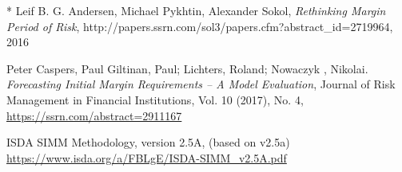 \documentclass[12pt, a4paper]{article}
\begin{document}
\begin{thebibliography}{*}
 Leif B. G. Andersen, Michael Pykhtin, Alexander Sokol, {\em Rethinking Margin Period of Risk},
  http://papers.ssrn.com/sol3/papers.cfm?abstract\_id=2719964, 2016

 Peter Caspers, Paul Giltinan, Paul; Lichters, Roland; Nowaczyk , Nikolai. {\em Forecasting Initial Margin Requirements – A Model Evaluation}, Journal of Risk Management in Financial Institutions, Vol. 10 (2017), No. 4, \url{https://ssrn.com/abstract=2911167}

 ISDA SIMM Methodology, version 2.5A, (based on v2.5a) \\
  \url{https://www.isda.org/a/FBLgE/ISDA-SIMM\_v2.5A.pdf}
  
\end{thebibliography}

\newpage
{}
\listoftodos[Todo]
\end{document}
